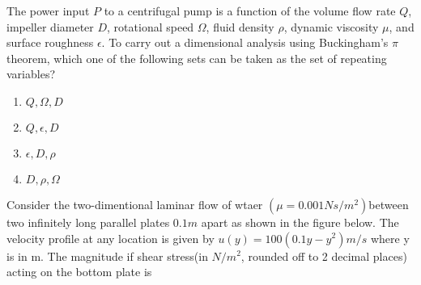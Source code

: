 \iffalse
\title{Assignment10}
\author{ee24btech11064}
\chapter{2019}
\section{xe}
\fi

\item The power input $P$ to a centrifugal pump is a function of the volume flow rate $Q$, impeller
diameter $D$, rotational speed $\Omega$, fluid density $\rho$, dynamic viscosity $\mu$, and surface
roughness $\epsilon$. To carry out a dimensional analysis using Buckingham's $\pi$ theorem, which one 
of the following sets can be taken as the set of repeating variables?
\begin{multicols}{2}
    \begin{enumerate}
        \item $Q,\Omega,D$
        \item $Q,\epsilon,D$
        \item $\epsilon,D,\rho$
        \item $D,\rho,\Omega$
    \end{enumerate}
\end{multicols}
\item Consider the two-dimentional laminar flow of wtaer $(\mu=0.001 Ns/m^2)$between two infinitely long parallel plates $0.1m$ apart as shown in the figure below. The velocity profile at any location is given by $u(y)=100(0.1y-y^2)m/s$ where y is in m. The magnitude if shear stress(in $N/m^2$, rounded off to 2 decimal places) acting on the bottom plate is \underline{\hspace{1cm}} 
